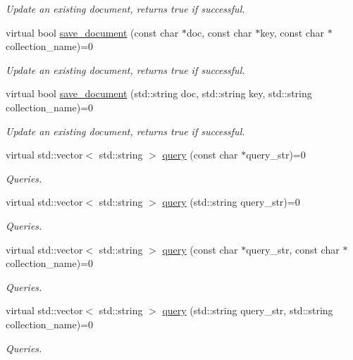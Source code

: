 \begin{DoxyCompactItemize}
\begin{DoxyCompactList}\small\item\em Update an existing document, returns true if successful. \end{DoxyCompactList}\item 
\hypertarget{classMongoInterface_adfa516bf12d5c1706712557eb8cb8b2d}{virtual bool \hyperlink{classMongoInterface_adfa516bf12d5c1706712557eb8cb8b2d}{save\-\_\-document} (const char $\ast$doc, const char $\ast$key, const char $\ast$collection\-\_\-name)=0}\label{classMongoInterface_adfa516bf12d5c1706712557eb8cb8b2d}

\begin{DoxyCompactList}\small\item\em Update an existing document, returns true if successful. \end{DoxyCompactList}\item 
\hypertarget{classMongoInterface_af52930b78196f9871d7e73af1d72cf0d}{virtual bool \hyperlink{classMongoInterface_af52930b78196f9871d7e73af1d72cf0d}{save\-\_\-document} (std\-::string doc, std\-::string key, std\-::string collection\-\_\-name)=0}\label{classMongoInterface_af52930b78196f9871d7e73af1d72cf0d}

\begin{DoxyCompactList}\small\item\em Update an existing document, returns true if successful. \end{DoxyCompactList}\item 
virtual std\-::vector$<$ std\-::string $>$ \hyperlink{classMongoInterface_aa1a04fd006a747e3d635d3d9b8a03641}{query} (const char $\ast$query\-\_\-str)=0
\begin{DoxyCompactList}\small\item\em Queries. \end{DoxyCompactList}\item 
virtual std\-::vector$<$ std\-::string $>$ \hyperlink{classMongoInterface_a7429239a2ed9db9828721df2a87c8aa9}{query} (std\-::string query\-\_\-str)=0
\begin{DoxyCompactList}\small\item\em Queries. \end{DoxyCompactList}\item 
virtual std\-::vector$<$ std\-::string $>$ \hyperlink{classMongoInterface_aefa3bae2edc15b154a4384cea179f534}{query} (const char $\ast$query\-\_\-str, const char $\ast$collection\-\_\-name)=0
\begin{DoxyCompactList}\small\item\em Queries. \end{DoxyCompactList}\item 
virtual std\-::vector$<$ std\-::string $>$ \hyperlink{classMongoInterface_a040eba5d49486ec4666fc812e382d6c8}{query} (std\-::string query\-\_\-str, std\-::string collection\-\_\-name)=0
\begin{DoxyCompactList}\small\item\em Queries. \end{DoxyCompactList}\end{DoxyCompactItemize}


